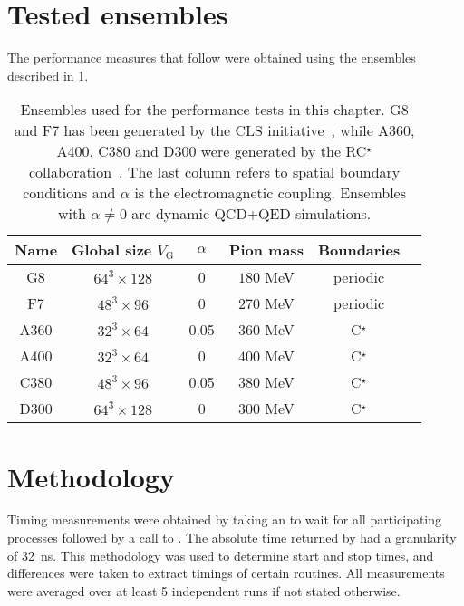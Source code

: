 
\section{Tested ensembles}
\label{sec:perf:ensembles}

The performance measures that follow were obtained using the ensembles described in \cref{tab:perf:ensembles}.
\begin{table}[htbp]
\centering
\begin{tabular}{cccccc}
Name & Global size $V_\mathrm{G}$ & $\alpha$ & Pion mass & Boundaries \\
\hline
G8   & $64^3 \times 128$ & \num{0}    & $180$ MeV & periodic  \\
F7   & $48^3 \times 96$  & \num{0}    & $270$ MeV & periodic  \\
A360 & $32^3 \times 64$  & \num{0.05} & $360$ MeV & C$^\star$ \\
A400 & $32^3 \times 64$  & \num{0}    & $400$ MeV & C$^\star$ \\
C380 & $48^3 \times 96$  & \num{0.05} & $380$ MeV & C$^\star$ \\
D300 & $64^3 \times 128$ & \num{0}    & $300$ MeV & C$^\star$
\end{tabular}
\caption{
Ensembles used for the performance tests in this chapter.
G8 and F7 has been generated by the CLS initiative~\cite{online:cls}, while A360, A400, C380 and D300 were generated by the RC$^\star$ collaboration~\cite{RCstar22}.
The last column refers to spatial boundary conditions and $\alpha$ is the electromagnetic coupling.
Ensembles with $\alpha \neq 0$ are dynamic QCD+QED simulations.}
\label{tab:perf:ensembles}
\end{table}

\section{Methodology}
\label{sec:perf:methodology}

Timing measurements were obtained by taking an  to wait for all participating processes followed by a call to .
The absolute time returned by  had a granularity of \SI{32}{\nano \second}.
This methodology was used to determine start and stop times, and differences were taken to extract timings of certain routines.
All measurements were averaged over at least \num{5} independent runs if not stated otherwise.

